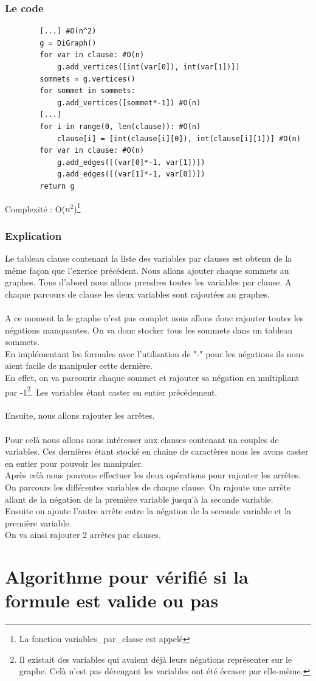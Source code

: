 \documentclass{article}
\begin{document}
    \subsubsection*{Le code}
    \begin{lstlisting}
        [...] #O(n^2)
        g = DiGraph()
        for var in clause: #O(n)
            g.add_vertices([int(var[0]), int(var[1])])
        sommets = g.vertices()
        for sommet in sommets:
            g.add_vertices([sommet*-1]) #O(n)
        [...]
        for i in range(0, len(clause)): #O(n)
            clause[i] = [int(clause[i][0]), int(clause[i][1])] #O(n)
        for var in clause: #O(n)
            g.add_edges([(var[0]*-1, var[1])])
            g.add_edges([(var[1]*-1, var[0])])
        return g
    \end{lstlisting} 
    Complexité : O($n^2$)\footnote{La fonction variables\_par\_classe est appelé}
    \subsubsection*{Explication}
    Le tableau clause contenant la liste des variables par clauses est obtenu de la même façon que l'exerice précédent.
    Nous allons ajouter chaque sommets au graphes. Tous d'abord nous allons prendres toutes les variables par clause. A chaque parcours de clause les deux variables sont rajoutées au graphes. \\
    \\ A ce moment la le graphe n'est pas complet nous allons donc rajouter toutes les négations manquantes. On va donc stocker tous les sommets dans un tableau sommets. \\
    En implémentant les formules avec l'utilisation de "-" pour les négations ils nous aient facile de manipuler cette dernière. \\
    En effet, on va parcourir chaque sommet et rajouter sa négation en multipliant par -1\footnote{Il existait des variables qui avaient déjà leurs négations représenter sur le graphe. Celà n'est pas dérengant les variables ont été écraser par elle-même.}. Les variables étant caster en entier précédement. \\
    \\
    Ensuite, nous allons rajouter les arrêtes. \\
    \\ Pour celà nous allons nous intéresser aux clauses contenant un couples de variables. Ces dernières étant stocké en chaine de caractères nous les avons caster en entier pour pouvoir les manipuler. \\
    Après celà nous pouvons effectuer les deux opérations pour rajouter les arrêtes. \\
    On parcours les différentes variables de chaque clause. On rajoute une arrête allant de la négation de la première variable jusqu'à la seconde variable. \\
    Ensuite on ajoute l'autre arrête entre la négation de la seconde variable et la première variable. \\
    On va ainsi rajouter 2 arrêtes par clauses.
    \section{Algorithme pour vérifié si la formule est valide ou pas}
    
\end{document}
